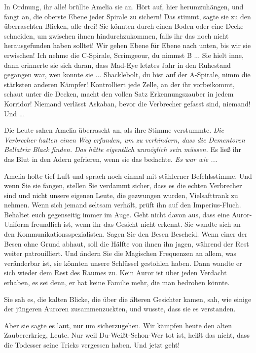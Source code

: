 \glqq{}In Ordnung, ihr alle!\grqq{} brüllte Amelia sie an. \glqq{}Hört auf, hier
herumzuhängen, und fangt an, die oberste Ebene jeder Spirale zu sichern! Das
stimmt\grqq{}, sagte sie zu den überraschten Blicken, \glqq{}alle drei! Sie
könnten durch einen Boden oder eine Decke schneiden, um zwischen ihnen
hindurchzukommen, falls ihr das noch nicht herausgefunden haben solltet! Wir
gehen Ebene für Ebene nach unten, bis wir sie erwischen! Ich nehme die
C-Spirale, Scrimgeour, du nimmst B ...\grqq{} Sie hielt inne, dann erinnerte sie sich
daran, dass Mad-Eye letztes Jahr in den Ruhestand gegangen war, wen konnte
sie ... \glqq{}Shacklebolt, du bist auf der A-Spirale, nimm die stärksten anderen
Kämpfer! Kontrolliert jede Zelle, an der ihr vorbeikommt, schaut unter die
Decken, macht den vollen Satz Erkennungszauber in jedem Korridor! Niemand
verlässt Askaban, bevor die Verbrecher gefasst sind, niemand! Und ...\grqq{}

Die Leute sahen Amelia überrascht an, als ihre Stimme verstummte. \emph{Die
Verbrecher hatten einen Weg erfunden, um zu verhindern, dass die Dementoren
Bellatrix Black finden. Das hätte eigentlich unmöglich sein müssen.} Es ließ ihr
das Blut in den Adern gefrieren, wenn sie das bedachte. \emph{Es war wie ...}

Amelia holte tief Luft und sprach noch einmal mit stählerner Befehlsstimme.
\glqq{}Und wenn Sie sie fangen, stellen Sie verdammt sicher, dass es die echten
Verbrecher sind und nicht unsere eigenen Leute, die gezwungen wurden,
Vielsafttrank zu nehmen. Wenn sich jemand seltsam verhält, prüft ihn auf den
Imperius-Fluch. Behaltet euch gegenseitig immer im Auge. Geht nicht davon aus,
dass eine Auror-Uniform freundlich ist, wenn ihr das Gesicht nicht erkennt.\grqq{} Sie
wandte sich an den Kommunikationsspezialisten. \glqq{}Sagen Sie den Besen
Bescheid. Wenn einer der Besen ohne Grund abhaut, soll die Hälfte von ihnen ihn
jagen, während der Rest weiter patrouilliert. Und ändern Sie die Magischen
Frequenzen an allem, was veränderbar ist, sie könnten unsere Schlüssel gestohlen
haben.\grqq{} Dann wandte er sich wieder dem Rest des Raumes zu. \glqq{}Kein Auror ist
über jeden Verdacht erhaben, es sei denn, er hat keine Familie mehr, die man
bedrohen könnte.\grqq{}

Sie sah es, die kalten Blicke, die über die älteren Gesichter kamen, sah, wie
einige der jüngeren Auroren zusammenzuckten, und wusste, dass sie es verstanden.

Aber sie sagte es laut, nur um sicherzugehen. \glqq{}Wir kämpfen heute den alten
Zaubererkrieg, Leute. Nur weil Du-Weißt-Schon-Wer tot ist, heißt das nicht, dass
die Todesser seine Tricks vergessen haben. Und jetzt geht!\grqq{}

